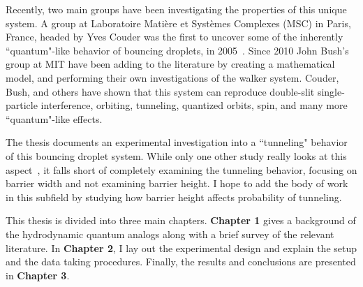 	Recently, two main groups have been investigating the properties of this unique system. A group at Laboratoire Mati\`{e}re et Syst\`{e}mes Complexes (MSC) in Paris, France, headed by Yves Couder was the first to uncover some of the inherently ``quantum"-like behavior of bouncing droplets, in 2005~\cite{Couder2005b}. Since 2010 John Bush's group at MIT have been adding to the literature by creating a mathematical model, and performing their own investigations of the walker system. Couder, Bush, and others have shown that this system can reproduce double-slit single-particle interference, orbiting, tunneling, quantized orbits, spin, and many more ``quantum"-like effects. 
		
	The thesis documents an experimental investigation into a ``tunneling" behavior of this bouncing droplet system. While only one other study really looks at this aspect~\cite{tunneling}, it falls short of completely examining the tunneling behavior, focusing on barrier width and not examining barrier height. I hope to add the body of work in this subfield by studying how barrier height affects probability of tunneling.   
	
	This thesis is divided into three main chapters. \textbf{Chapter 1} gives a background of the hydrodynamic quantum analogs along with a brief survey of the relevant literature. In \textbf{Chapter 2}, I lay out the experimental design and explain the setup and the data taking procedures. Finally, the results and conclusions are presented in \textbf{Chapter 3}.	    